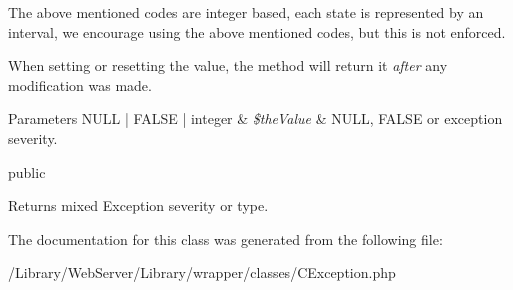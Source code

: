 The above mentioned codes are integer based, each state is represented by an interval, we encourage using the above mentioned codes, but this is not enforced.

When setting or resetting the value, the method will return it {\itshape after\/} any modification was made.


\begin{DoxyParams}[1]{Parameters}
N\-U\-L\-L | F\-A\-L\-S\-E | integer & {\em \$the\-Value} & N\-U\-L\-L, F\-A\-L\-S\-E or exception severity.\\
\hline
\end{DoxyParams}
public \begin{DoxyReturn}{Returns}
mixed Exception severity or type. 
\end{DoxyReturn}


The documentation for this class was generated from the following file\-:\begin{DoxyCompactItemize}
\item 
/\-Library/\-Web\-Server/\-Library/wrapper/classes/C\-Exception.\-php\end{DoxyCompactItemize}
